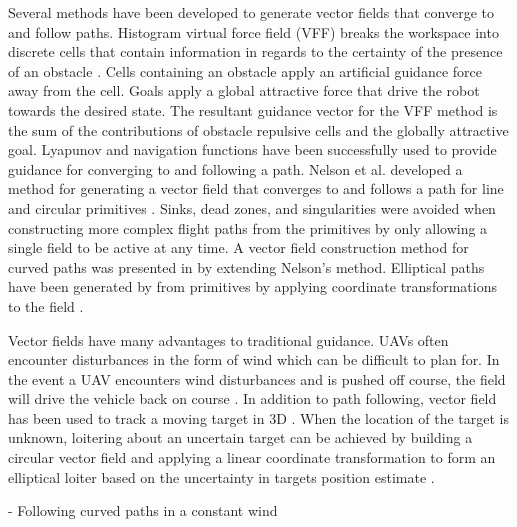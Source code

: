 \documentclass[numbered,pdftex]{ohio-etd}
\begin{document}
Several methods have been developed to generate vector fields that converge to and follow paths. Histogram virtual force field (VFF) breaks the workspace into discrete cells that contain information in regards to the certainty of the presence of an obstacle \cite{borenstein_real-time_1990} \cite{borenstein_vector_1991}. Cells containing an obstacle apply an artificial guidance force away from the cell. Goals apply a global attractive force that drive the robot towards the desired state. The resultant guidance vector for the VFF method is the sum of the contributions of obstacle repulsive cells and the globally attractive goal. Lyapunov and navigation functions have been successfully used to provide guidance for converging to and following a path. Nelson et al. developed a method for generating a vector field that converges to and follows a path for line and circular primitives \cite{nelson_cooperative_2005}. Sinks, dead zones, and singularities were avoided when constructing more complex flight paths from the primitives by only allowing a single field to be active at any time. A vector field construction method for curved paths was presented in \cite{griffiths_vector_2006} by extending Nelson's method. Elliptical paths have been generated by from primitives by applying coordinate transformations to the field \cite{frew_lyapunov_nodate}.




Vector fields have many advantages to traditional guidance. UAVs often encounter disturbances in the form of wind which can be difficult to plan for. In the event a UAV encounters wind disturbances and is pushed off course, the field will drive the vehicle back on course \cite{de_marina_guidance_2017}. In addition to path following, vector field has been used to track a moving target in 3D \cite{miao_orthogonal_2016}. When the location of the target is unknown, loitering about an uncertain target can be achieved by building a circular vector field and applying a linear coordinate transformation to form an elliptical loiter based on the uncertainty in targets position estimate \cite{frew_cooperative_2007}. 


%
%
%
%

- Following curved paths in a constant wind \cite{griffiths_vector_2006}


%
%
%
\end{document}
